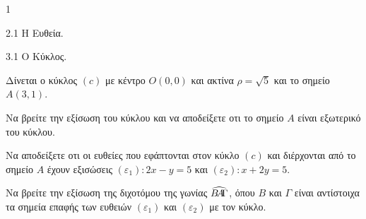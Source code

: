 \begin{ylh}{1}
    \item 2.1 Η Ευθεία.
    \item 3.1 Ο Κύκλος.
\end{ylh}
Δίνεται ο κύκλος $(c)$ με κέντρο $O(0,0)$ και ακτίνα $\rho = \sqrt{5}$ και το σημείο $A(3,1)$.
\begin{alist}
\item Να βρείτε την εξίσωση του κύκλου και να αποδείξετε οτι το σημείο $A$ είναι εξωτερικό του κύκλου. 
\item \begin{rlist}
    \item Να αποδείξετε οτι οι ευθείες που εφάπτονται στον κύκλο $(c)$ και διέρχονται από το σημείο $A$ έχουν εξισώσεις $(\varepsilon_1): 2x - y = 5$ και $(\varepsilon_2): x + 2y = 5$. 
    \item Να βρείτε την εξίσωση της διχοτόμου της γωνίας $\widehat{B\kern-0.2em A\kern-0.2em \Gamma}$, όπου $B$ και $\Gamma$ είναι αντίστοιχα τα σημεία επαφής των ευθειών $(\varepsilon_1)$ και $(\varepsilon_2)$ με τον κύκλο. 
\end{rlist}
\end{alist}